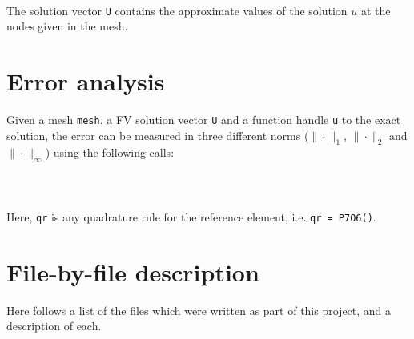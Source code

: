 \documentclass[a4paper,10pt]{article}
\begin{document}
 \\

The solution vector {\tt U} contains the approximate values of the solution $u$
at the nodes given in the mesh.

\section{Error analysis}

Given a mesh {\tt mesh}, a FV solution vector {\tt U} and a function handle 
{\tt u} to the exact solution, the error can be measured in three different
norms ($\|\cdot\|_1$, $\|\cdot\|_2$ and $\|\cdot\|_\infty$) using the 
following calls: \\

 \\
 \\
 \\

Here, {\tt qr} is any quadrature rule for the reference element, i.e.
{\tt qr = P7O6()}.

\section{File-by-file description}

Here follows a list of the files which were written as part of this project,
and a description of each.
\end{document}
